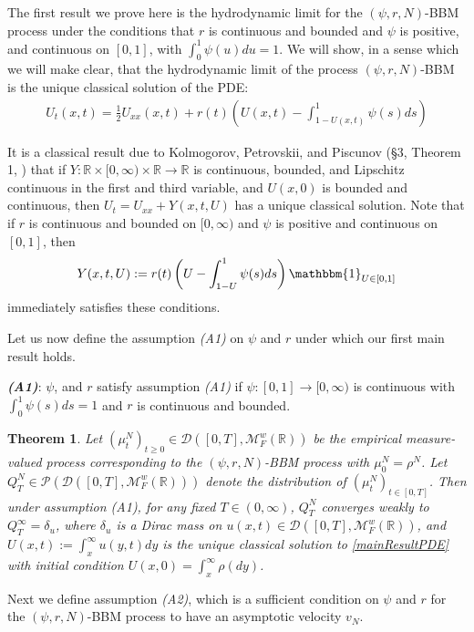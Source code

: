 \documentclass{article}
\newtheorem{theorem}{Theorem}
\newcommand{\B}[1]{\mathbb{#1}}
\newcommand{\C}[1]{\mathcal{#1}}
\newcommand{\is}{\mathbbm{1}}
\newcommand{\JB}[1]{\textcolor{blue!70!black}{\textbf{JB:} #1}}
\begin{document}
The first result we prove here is the hydrodynamic limit for the $(\psi,r,N)$-BBM process under the conditions that $r$ is continuous and bounded and $\psi$ is positive, and continuous on $[0,1]$, with $\int_0^1 \psi(u)du=1$. We will show, in a sense which we will make clear, that the hydrodynamic limit of the process $(\psi,r,N)$-BBM is the unique classical solution of the PDE:
\begin{align} \label{mainResultPDE} U_t(x,t)= \frac12 U_{xx}(x,t) + r(t)\left(U(x,t) - \int_{1-U(x,t)}^1 \psi(s)ds\right) \end{align}

It is a classical result due to Kolmogorov, Petrovskii, and Piscunov (\S 3, Theorem 1, \cite{kpp}) that if $Y:\B{R}\times [0,\infty)\times \B{R}\to \B{R}$ is continuous, bounded, and Lipschitz continuous in the first and third variable, and $U(x,0)$ is bounded and continuous, then $U_t=U_{xx}+Y(x,t,U)$ has a unique classical solution. Note that if $r$ is continuous and bounded on $[0,\infty)$ and $\psi$ is positive and continuous on $[0,1]$, then $$Y(x,t,U):=r(t)\left(U-\int_{1-U}^1\psi(s)ds\right)\is_{U\in [0,1]}$$ immediately satisfies these conditions. 

Let us now define the assumption \textit{(A1)} on $\psi$ and $r$ under which our first main result holds. 

\textbf{\textit{(A1)}}: $\psi$, and $r$ satisfy assumption \textit{(A1)} if $\psi:[0,1]\to[0,\infty)$ is continuous with $\int_0^1 \psi(s)ds=1$ and $r$ is continuous and bounded.

\vspace{1em}

\begin{theorem} \label{psirNGeneralLimit}
    Let $(\mu^N_t)_{t\geq 0}\in \C{D}([0,T],\C{M}_F^w(\B{R}))$ be the empirical measure-valued process corresponding to the $(\psi,r,N)$-BBM process with $\mu^N_0=\rho^N$. Let $Q^N_T\in \C{P}(\C{D}([0,T],\C{M}^w_F(\B{R})))$ denote the distribution of $(\mu_t^N)_{t\in [0,T]}$. Then under assumption (A1), for any fixed $T\in (0,\infty)$, $Q^N_T$ converges weakly to $Q^\infty_T=\delta_{u}$, where $\delta_{u}$ is a Dirac mass on $u(x,t)\in \C{D}([0,T],\C{M}^w_F(\B{R}))$, and $U(x,t):=\int_x^\infty u(y,t)dy$ is the unique classical solution to \eqref{mainResultPDE} with initial condition $U(x,0)=\int_x^\infty \rho(dy)$.
\end{theorem}


Next we define assumption \textit{(A2)}, which is a sufficient condition on $\psi$ and $r$ for the $(\psi,r,N)$-BBM process to have an asymptotic velocity $v_N$.
\end{document}
